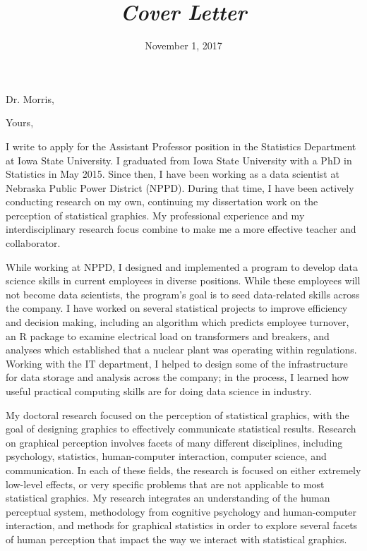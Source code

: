 \documentclass[12pt, letterpaper, sans]{moderncv}
\title{\emph{Cover Letter}}
\begin{document}
\date{November 1, 2017}
\opening{Dr. Morris,}
\closing{Yours,}
\makelettertitle

I write to apply for the Assistant Professor position in the Statistics Department at Iowa State University. I graduated from Iowa State University with a PhD in Statistics in May 2015. Since then, I have been working as a data scientist at Nebraska Public Power District (NPPD). During that time, I have been actively conducting research on my own, continuing my dissertation work on the perception of statistical graphics. My professional experience and my interdisciplinary research focus combine to make me a more effective teacher and collaborator. 

While working at NPPD, I designed and implemented a program to develop data science skills in current employees in diverse positions. While these employees will not become data scientists, the program's goal is to seed data-related skills across the company. I have worked on several statistical projects to improve efficiency and decision making, including an algorithm which predicts employee turnover, an R package to examine electrical load on transformers and breakers, and analyses which established that a nuclear plant was operating within regulations. Working with the IT department, I helped to design some of the infrastructure for data storage and analysis across the company; in the process, I learned how useful practical computing skills are for doing data science in industry.  

My doctoral research focused on the perception of statistical graphics, with the goal of designing graphics to effectively communicate statistical results. Research on graphical perception involves facets of many different disciplines, including psychology, statistics, human-computer interaction, computer science, and communication. In each of these fields, the research is focused on either extremely low-level effects, or very specific problems that are not applicable to most statistical graphics. My research integrates an understanding of the human perceptual system, methodology from cognitive psychology and human-computer interaction, and methods for graphical statistics in order to explore several facets of human perception that impact the way we interact with statistical graphics.
\end{document}
